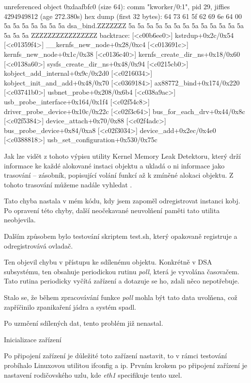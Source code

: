 \begtt
unreferenced object 0xdaafbfc0 (size 64):
  comm "kworker/0:1", pid 29, jiffies 4294949812 (age 272.380s)
  hex dump (first 32 bytes):
    64 73 61 5f 62 69 6e 64 00 5a 5a 5a 5a 5a 5a 5a  dsa_bind.ZZZZZZZ
    5a 5a 5a 5a 5a 5a 5a 5a 5a 5a 5a 5a 5a 5a 5a 5a  ZZZZZZZZZZZZZZZZ
  backtrace:
    [<c00b6ee0>] kstrdup+0x2c/0x54
    [<c01359f4>] __kernfs_new_node+0x28/0xc4
    [<c013691c>] kernfs_new_node+0x1c/0x38
    [<c0136c40>] kernfs_create_dir_ns+0x18/0x60
    [<c0138a60>] sysfs_create_dir_ns+0x48/0x94
    [<c0215cb0>] kobject_add_internal+0x9c/0x2d0
    [<c0216034>] kobject_init_and_add+0x48/0x70
    [<c0369184>] ax88772_bind+0x174/0x220
    [<c03741b0>] usbnet_probe+0x208/0x6b4
    [<c038a9ac>] usb_probe_interface+0x164/0x1f4
    [<c02f54c8>] driver_probe_device+0x10c/0x22c
    [<c02f3c64>] bus_for_each_drv+0x44/0x8c
    [<c02f5384>] device_attach+0x70/0x88
    [<c02f4adc>] bus_probe_device+0x84/0xa8
    [<c02f3034>] device_add+0x2ec/0x4e0
    [<c0388818>] usb_set_configuration+0x530/0x75c
\endtt

Jak lze vidět z tohoto výpisu utility Kernel Memory Leak Detektoru, který drží informace ke každé alokované instaci objektu a ukladá o ni informace jako trasování -- zásobník, popisující volání funkcí až k zmíněné alokaci objektu.
Z tohoto trasování můžeme nadále vyhledat .

Tato chyba nastala v mém kódu, kdy jsem zapoměl odregistrovat instanci kobj.
Po opravení této chyby, další neočekavané neuvolňení paměti tato utilita neobjevila.

Dalším způsobem bylo testování skriptem test.sh, který opakovaně registruje a odregistrovává ovladač.

Ten objevil chybu v přístupu ke sdílenému objektu.
Konkrétně v DSA subsystému, ten obsahuje periodickou rutinu {\em poll}, která je vyvolána časovačem.
Tato rutina periodicky vyčítá zařízení a dotazuje se ho, zdali něco nepotřebuje.

Stalo se, že během zpracovávání funkce {\em poll} mohla být tato data uvolňena, což zapříčinilo zpanikaření jádra a systém spadl.

Po uzmčení sdílených dat, tento problém již nenastal.

\sec Inicializace zařízení

Po připojení zařízení je důležité toto zařízení nastavit, to v rámci testování probíhalo Linuxovou utilitou ifconfig a ip.
Prvním krokem po připojení zařízení je nastavení rodičovského uzlu, kde {\em eth1} specifikuje tento uzel.


